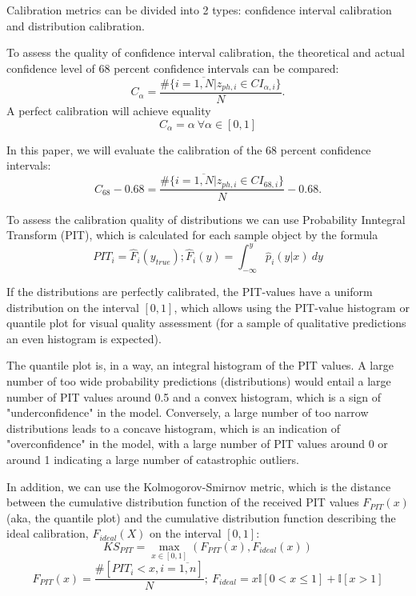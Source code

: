 \documentclass[fleqn,usenatbib]{mnras}
\begin{document}
Calibration metrics can be divided into 2 types: confidence interval calibration and distribution calibration.

To assess the quality of confidence interval calibration, the theoretical and actual confidence level of 68 percent confidence intervals can be compared:
\begin{equation}\label{eq:calpha}
    C_{\alpha} = \frac{\#\{i = \overline{1, N} | z_{ph,i} \in CI_{\alpha, i}\}}{N}.
\end{equation}
A perfect calibration will achieve equality
\begin{equation}\label{eq:perfect-ci}
    C_{\alpha} = \alpha ~ \forall \alpha \in [0, 1]
\end{equation}

In this paper, we will evaluate the calibration of the 68 percent confidence intervals:
\begin{equation}\label{eq:c68}
    C_{68} - 0.68 = \frac{\#\{i = \overline{1, N} | z_{ph,i} \in CI_{68, i}\}}{N} - 0.68.
\end{equation}

To assess the calibration quality of distributions we can use Probability Inntegral Transform (PIT), which is calculated for each sample object by the formula
\begin{equation}\label{eq:pit}
PIT_i = \hat{F}_i(y_{true}); \hat{F}_i(y) = \int_{-\infty}^{y} \hat{p}_i(y|x) ~ dy
\end{equation}

If the distributions are perfectly calibrated, the PIT-values have a uniform distribution on the interval \([0,1]\), which allows using the PIT-value histogram or quantile plot for visual quality assessment (for a sample of qualitative predictions an even histogram is expected).

The quantile plot is, in a way, an integral histogram of the PIT values. A large number of too wide probability predictions (distributions) would entail a large number of PIT values around 0.5 and a convex histogram, which is a sign of "underconfidence" in the model. Conversely, a large number of too narrow distributions leads to a concave histogram, which is an indication of "overconfidence" in the model, with a large number of PIT values around 0 or around 1 indicating a large number of catastrophic outliers. 

In addition, we can use the Kolmogorov-Smirnov metric, which is the distance between the cumulative distribution function of the received PIT values \(F_{PIT}(x)\) (aka, the quantile plot) and the cumulative distribution function describing the ideal calibration, \(F_{ideal}(X)\) on the interval \([0,1]\):
\begin{equation}\label{eq:kspit}
    KS_{PIT} = \max_{x \in [0,1]}(F_{PIT}(x), F_{ideal}(x))
\end{equation}{}
\begin{equation}
    F_{PIT}(x) = \frac{\#[PIT_i < x, i=\overline{1,n}]}{N}; ~ F_{ideal} = x\mathbb{I}[0 < x \leq 1] + \mathbb{I}[x > 1]
\end{equation}{}
\end{document}
